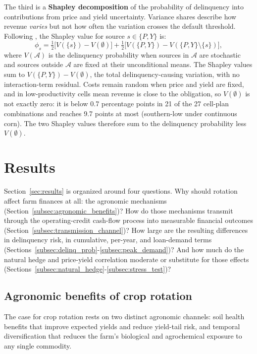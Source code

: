 \documentclass[11pt,letterpaper]{article}
\theoremstyle{remark}
\begin{document}
The third is a \textbf{Shapley decomposition} of the probability of delinquency into contributions from price and yield uncertainty. Variance shares describe how revenue \textit{varies} but not how often the variation crosses the default threshold. Following \citet{Shorrocks2013}, the Shapley value for source $s \in \{P, Y\}$ is:
\begin{equation}
\phi_s = \tfrac{1}{2}\bigl[V(\{s\}) - V(\emptyset)\bigr] + \tfrac{1}{2}\bigl[V(\{P,Y\}) - V(\{P,Y\} \setminus \{s\})\bigr],
\end{equation}
where $V(\mathcal{A})$ is the delinquency probability when sources in $\mathcal{A}$ are stochastic and sources outside $\mathcal{A}$ are fixed at their unconditional means. The Shapley values sum to $V(\{P,Y\}) - V(\emptyset)$, the total delinquency-causing variation, with no interaction-term residual. Costs remain random when price and yield are fixed, and in low-productivity cells mean revenue is close to the obligation, so $V(\emptyset)$ is not exactly zero: it is below 0.7 percentage points in 21 of the 27 cell-plan combinations and reaches 9.7 points at most (southern-low under continuous corn). The two Shapley values therefore sum to the delinquency probability less $V(\emptyset)$.
 
\section{\label{sec:results}Results}
 
Section~\ref{sec:results} is organized around four questions. Why should rotation affect farm finances at all: the agronomic mechanisms (Section~\ref{subsec:agronomic_benefits})? How do those mechanisms transmit through the operating-credit cash-flow process into measurable financial outcomes (Section~\ref{subsec:transmission_channel})? How large are the resulting differences in delinquency risk, in cumulative, per-year, and loan-demand terms (Sections~\ref{subsec:delinq_prob}-\ref{subsec:peak_demand})? And how much do the natural hedge and price-yield correlation moderate or substitute for those effects (Sections~\ref{subsec:natural_hedge}-\ref{subsec:stress_test})?
 
\subsection{\label{subsec:agronomic_benefits}Agronomic benefits of crop rotation}
 
The case for crop rotation rests on two distinct agronomic channels: soil health benefits that improve expected yields and reduce yield-tail risk, and temporal diversification that reduces the farm's biological and agrochemical exposure to any single commodity.
 
\end{document}
